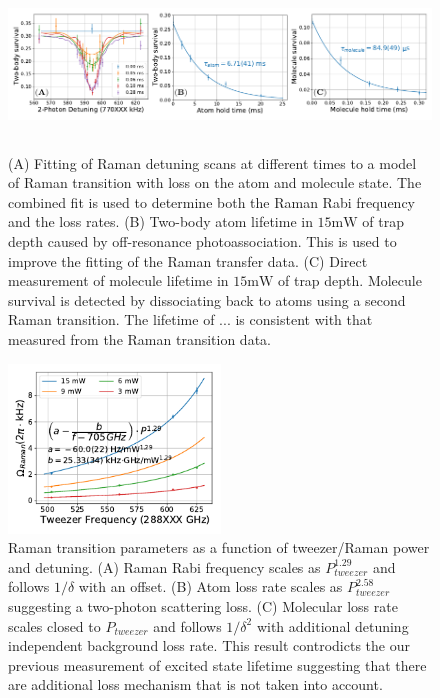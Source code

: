 \documentclass[aps,prl,twocolumn,groupedaddress]{revtex4-1}
\newcommand{\todo}[1]{}
\begin{document}
\begin{figure}
  \includegraphics[height=4.5cm]{fig3.pdf}
  \caption{
    (A) Fitting of Raman detuning scans at different times to a model of Raman transition
    with loss on the atom and molecule state. The combined fit is used to determine
    both the Raman Rabi frequency and the loss rates.
    (B) \todo{inset?} Two-body atom lifetime in $15 \mathrm{mW}$ of trap depth caused by
    off-resonance photoassociation.
    This is used to improve the fitting of the Raman transfer data.
    (C) Direct measurement of molecule lifetime in $15 \mathrm{mW}$ of trap depth.
    Molecule survival is detected by dissociating back to atoms using a second Raman transition.
    The lifetime of $...$ is consistent with that measured from the Raman transition data.
    \label{f-lifetime}}
\end{figure}

\begin{figure}
  \includegraphics[height=4.5cm]{fig4.pdf}
  \caption{Raman transition parameters as a function of tweezer/Raman power and detuning.
    (A) Raman Rabi frequency scales as $P_{tweezer}^{1.29}$ and follows $1/\delta$ with an offset.
    (B) Atom loss rate scales as $P_{tweezer}^{2.58}$ suggesting a two-photon scattering loss.
    (C) Molecular loss rate scales closed to $P_{tweezer}$ and follows $1/\delta^2$
    with additional detuning independent background loss rate.
    This result controdicts the our previous measurement of excited state lifetime
    suggesting that there are additional loss mechanism that is not taken into account.
    \label{f-det}}
\end{figure}
\end{document}
